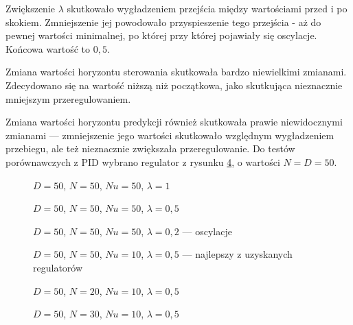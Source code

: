 Zwiększenie $ \lambda $ skutkowało wygładzeniem przejścia między wartościami przed i po skokiem. Zmniejszenie jej powodowało przyspieszenie tego przejścia - aż do pewnej wartości minimalnej, po której przy której pojawiały się oscylacje. Końcowa wartość to $ 0,5 $.

Zmiana wartości horyzontu sterowania skutkowała bardzo niewielkimi zmianami. Zdecydowano się na wartość niższą niż początkowa, jako skutkująca nieznacznie mniejszym przeregulowaniem.

Zmiana wartości horyzontu predykcji również skutkowała prawie niewidocznymi zmianami --- zmniejszenie jego wartości skutkowało względnym wygładzeniem przebiegu, ale też nieznacznie zwiększała przeregulowanie. Do testów porównawczych z PID wybrano regulator z rysunku \ref{DMC6}, o wartości $ N = D = 50 $.

\begin{figure}[H]
\centering

\caption{$ D = 50 $, $  N = 50 $, $ Nu = 50 $, $ \lambda = 1 $}
\label{DMC3}
\end{figure}

\begin{figure}[H]
\centering

\caption{$ D = 50 $, $  N = 50 $, $ Nu = 50 $, $ \lambda = 0,5 $}
\label{DMC4}
\end{figure}

\begin{figure}[H]
\centering

\caption{$ D = 50 $, $  N = 50 $, $ Nu = 50 $, $ \lambda = 0,2 $ --- oscylacje}
\label{DMC5}
\end{figure}

\begin{figure}[H]
\centering

\caption{$ D = 50 $, $  N = 50 $, $ Nu = 10 $, $ \lambda = 0,5 $ --- najlepszy z uzyskanych regulatorów}
\label{DMC6}
\end{figure}

\begin{figure}[H]
\centering

\caption{$ D = 50 $, $  N = 20 $, $ Nu = 10 $, $ \lambda = 0,5 $}
\label{DMC7}
\end{figure}

\begin{figure}[H]
\centering

\caption{$ D = 50 $, $  N = 30 $, $ Nu = 10 $, $ \lambda = 0,5 $}
\label{DMC8}
\end{figure}

